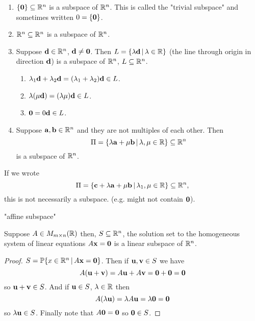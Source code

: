 \documentclass[10pt, a4paper]{article}
\begin{document}
\begin{example}\phantom{}
    \begin{enumerate}[label = (\roman*)]
        \item $\{\mathbf{0}\} \subseteq \mathbb{R} ^ n$ is a subspace of $\mathbb{R} ^ n$.
        This is called the "trivial subspace" and sometimes written $0 = \{\mathbf{0}\}$.
        \item $\mathbb{R} ^ n \subseteq \mathbb{R} ^ n$ is a subspace of $\mathbb{R} ^ n$.
        \item Suppose $\mathbf{d} \in \mathbb{R} ^ n$, $\mathbf{d \neq 0}$.
        Then $L = \{\lambda\mathbf{d}\,|\,\lambda \in \mathbb{R}\}$
        (the line through origin in direction $\mathbf{d}$)
        is a subspace of $\mathbb{R} ^ n$, $L \subseteq \mathbb{R} ^ n$.
            \begin{enumerate}[label = (\roman*)]
                \item $\lambda_1 \mathbf{d} + \lambda_2\mathbf{d} = (\lambda_1 + \lambda_2)\mathbf{d} \in L$.
                \item $\lambda(\mu\mathbf{d}) = (\lambda\mu)\mathbf{d} \in L$.
                \item $\mathbf{0} = 0\mathbf{d} \in L$.
            \end{enumerate}
        \item Suppose $\mathbf{a, b} \in \mathbb{R} ^ n$ and they are not multiples of each other.
        Then
        \[
        \Pi = \{\lambda\mathbf{a} + \mu\mathbf{b}\,|\,\lambda, \mu \in \mathbb{R}\} \subseteq \mathbb{R} ^ n
        \]
        is a subspace of $\mathbb{R} ^ n$.
    \end{enumerate}
    If we wrote
    \[
    \Pi = \{\mathbf{c} + \lambda\mathbf{a} + \mu\mathbf{b}\,|\,\lambda_1, \mu \in \mathbb{R}\} \subseteq \mathbb{R} ^ n,
    \]
    this is not necessarily a subspace.
    (e.g. might not contain $\mathbf{0}$).
\end{example}

"affine subspace"

\begin{proposition}
    Suppose $A \in M_{m \times n}(\mathbb{R})$ then,
    $S \subseteq \mathbb{R} ^ n$,
    the solution set to the homogeneous system of linear equations $A\mathbf{x} = \mathbf{0}$ is a linear subspace of $\mathbb{R} ^ n$.
    \begin{proof}
        $S = \mathbb{P}\{x \in \mathbb{R} ^ n\,|\, A\mathbf{x} = \mathbf{0}\}$.
        Then if $\mathbf{u, v} \in S$ we have
        \[
        A(\mathbf{u + v}) = A\mathbf{u} + A\mathbf{v} = \mathbf{0} + \mathbf{0} = \mathbf{0}
        \]
        so $\mathbf{u + v} \in S$.
        And if $\mathbf{u} \in S$, $\lambda \in \mathbb{R}$ then
        \[
        A(\lambda\mathbf{u}) = \lambda A\mathbf{u} = \lambda\mathbf{0} = \mathbf{0}
        \]
        so $\lambda\mathbf{u} \in S$.
        Finally note that $A\mathbf{0} = \mathbf{0}$ so $\mathbf{0} \in S$.
    \end{proof}
\end{proposition}
\end{document}
